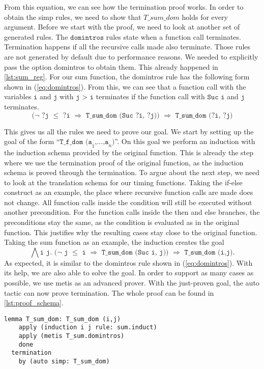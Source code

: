 From this equation, we can see how the termination proof works.
In order to obtain the simp rules, we need to show that $T\_sum\_dom$ holds for every argument.
Before we start with the proof, we need to look at another set of generated rules.
The $\texttt{domintros}$ rules state when a function call terminates.
Termination happens if all the recursive calls made also terminate.
Those rules are not generated by default due to performance reasons.
We needed to explicitly pass the option domintros to obtain them.
This already happened in \autoref{lst:sum_reg}.
For our sum function, the domintros rule has the following form shown in (\ref{eq:domintros}).
From this, we can see that a function call with the variables $\texttt{i}$ and $\texttt{j}$ with $\texttt{j > i}$ terminates
if the function call with $\texttt{Suc i}$ and $\texttt{j}$ terminates.
\begin{equation}
  \texttt{($\lnot$ ?j $\le$ ?i $\Longrightarrow$ T\_sum\_dom (Suc ?i, ?j)) $\Longrightarrow$ T\_sum\_dom (?i, ?j)}
\label{eq:domintros}
\end{equation}

This gives us all the rules we need to prove our goal.
We start by setting up the goal of the form ``$\texttt{T\_f\_dom (a}_{1}\texttt{,}\dots\texttt{,a}_{n}\texttt{)}$''.
On this goal we perform an induction with the induction schema provided by the original function.
This is already the step where we use the termination proof of the original function,
as the induction schema is proved through the termination.
To argue about the next step, we need to look at the translation schema for our timing functions.
Taking the if-else construct as an example, the place where recursive function calls are made does not change.
All function calls inside the condition will still be executed without another precondition.
For the function calls inside the then and else branches, the preconditions stay the same, as the condition is evaluated as in the original function.
This justifies why the resulting cases stay close to the original function.
Taking the sum function as an example, the induction creates the goal
\begin{equation*}
  \texttt{$\bigwedge$i j. ($\lnot$ j $\le$ i $\Longrightarrow$ T\_sum\_dom (Suc i, j)) $\Longrightarrow$ T\_sum\_dom (i,j)}.
\end{equation*}
As expected, it is similar to the domintros rule shown in (\ref{eq:domintros}).
With its help, we are also able to solve the goal.
In order to support as many cases as possible, we use metis as an advanced prover.
With the just-proven goal, the auto tactic can now prove termination.
The whole proof can be found in \autoref{lst:proof_schema}.
\begin{lstlisting}[language=isabelle,mathescape=true,label=lst:proof_schema,caption=Proof schema over dom with help of original function]
  lemma T_sum_dom: T_sum_dom (i,j)
    apply (induction i j rule: sum.induct)
    apply (metis T_sum.domintros)
    done
  termination
    by (auto simp: T_sum_dom)
\end{lstlisting}

